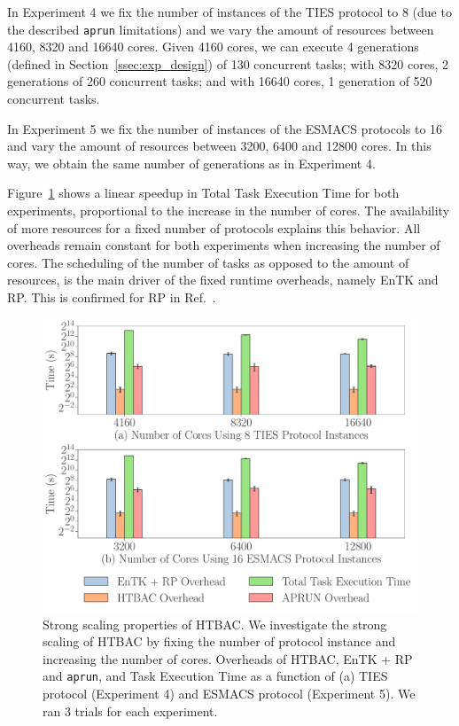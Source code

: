 
In Experiment 4 we fix the number of instances of the TIES protocol to 8 (due
to the described \texttt{aprun} limitations) and we vary the amount of
resources between 4160, 8320 and 16640 cores. Given 4160 cores, we can
execute 4 generations (defined in Section~\ref{ssec:exp_design}) of 130
concurrent tasks; with 8320 cores, 2 generations of 260 concurrent tasks; and
with 16640 cores, 1 generation of 520 concurrent tasks.

In Experiment 5 we fix the number of instances of the ESMACS protocols to 16
and vary the amount of resources between 3200, 6400 and 12800 cores. In this
way, we obtain the same number of generations as in Experiment 4.

Figure~\ref{fig:ss} shows a linear speedup in Total Task Execution Time for
both experiments, proportional to the increase in the number of cores. The
availability of more resources for a fixed number of protocols explains this
behavior. All overheads remain constant for both experiments when increasing
the number of cores. The scheduling of the number of tasks as opposed to the
amount of resources, is the main driver of the fixed runtime overheads,
namely EnTK and RP. This is confirmed for RP in Ref.~\cite{merzky2018}.

\begin{figure}
  \centering
   \includegraphics[width=\columnwidth]{figures/ss_all_base2.pdf} 
   \caption{Strong scaling properties of HTBAC. We investigate the strong
    scaling of HTBAC by fixing the number of protocol instance and increasing
    the number of cores. Overheads of HTBAC, EnTK + RP and \texttt{aprun},
    and Task Execution Time as a function of (a) TIES protocol (Experiment 4)
    and ESMACS protocol (Experiment 5). We ran 3 trials for each experiment.}
\label{fig:ss}
\end{figure}

